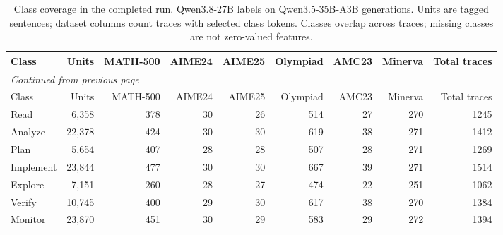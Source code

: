 \begingroup\scriptsize\setlength{\tabcolsep}{4pt}
\begin{longtable}{@{}lrrrrrrrr@{}}
\caption{Class coverage in the completed run. Qwen3.8-27B labels on Qwen3.5-35B-A3B generations. Units are tagged sentences; dataset columns count traces with selected class tokens. Classes overlap across traces; missing classes are not zero-valued features.}\label{tab:qwen-class-coverage}\\
\toprule
Class & Units & MATH-500 & AIME24 & AIME25 & Olympiad & AMC23 & Minerva & Total traces \\
\midrule\endfirsthead
\multicolumn{9}{l}{\textit{Continued from previous page}}\\
\toprule
Class & Units & MATH-500 & AIME24 & AIME25 & Olympiad & AMC23 & Minerva & Total traces \\
\midrule\endhead
\bottomrule\endfoot
Read & 6,358 & 378 & 30 & 26 & 514 & 27 & 270 & 1245 \\
Analyze & 22,378 & 424 & 30 & 30 & 619 & 38 & 271 & 1412 \\
Plan & 5,654 & 407 & 28 & 28 & 507 & 28 & 271 & 1269 \\
Implement & 23,844 & 477 & 30 & 30 & 667 & 39 & 271 & 1514 \\
Explore & 7,151 & 260 & 28 & 27 & 474 & 22 & 251 & 1062 \\
Verify & 10,745 & 400 & 29 & 30 & 617 & 38 & 270 & 1384 \\
Monitor & 23,870 & 451 & 30 & 29 & 583 & 29 & 272 & 1394 \\
\end{longtable}\endgroup
